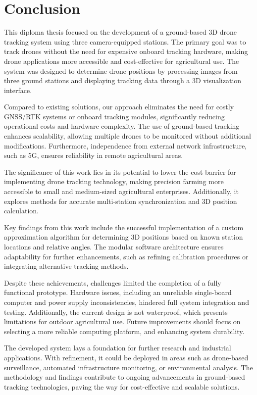 \chapter{Conclusion}

This diploma thesis focused on the development of a ground-based 3D drone tracking system using three camera-equipped stations. The primary goal was to track drones without the need for expensive onboard tracking hardware, making drone applications more accessible and cost-effective for agricultural use. The system was designed to determine drone positions by processing images from three ground stations and displaying tracking data through a 3D visualization interface.

Compared to existing solutions, our approach eliminates the need for costly GNSS/RTK systems or onboard tracking modules, significantly reducing operational costs and hardware complexity. The use of ground-based tracking enhances scalability, allowing multiple drones to be monitored without additional modifications. Furthermore, independence from external network infrastructure, such as 5G, ensures reliability in remote agricultural areas.

The significance of this work lies in its potential to lower the cost barrier for implementing drone tracking technology, making precision farming more accessible to small and medium-sized agricultural enterprises. Additionally, it explores methods for accurate multi-station synchronization and 3D position calculation.

Key findings from this work include the successful implementation of a custom approximation algorithm for determining 3D positions based on known station locations and relative angles. The modular software architecture ensures adaptability for further enhancements, such as refining calibration procedures or integrating alternative tracking methods.

Despite these achievements, challenges limited the completion of a fully functional prototype. Hardware issues, including an unreliable single-board computer and power supply inconsistencies, hindered full system integration and testing. Additionally, the current design is not waterproof, which presents limitations for outdoor agricultural use. Future improvements should focus on selecting a more reliable computing platform, and enhancing system durability.

The developed system lays a foundation for further research and industrial applications. With refinement, it could be deployed in areas such as drone-based surveillance, automated infrastructure monitoring, or environmental analysis. The methodology and findings contribute to ongoing advancements in ground-based tracking technologies, paving the way for cost-effective and scalable solutions.
